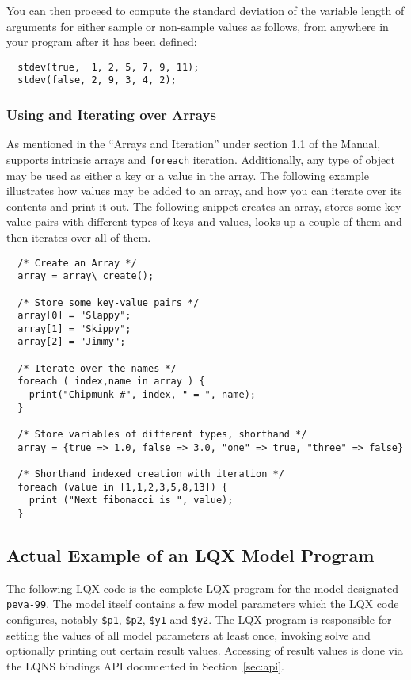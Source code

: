 You can then proceed to compute the standard deviation of the variable length of
arguments for either sample or non-sample values as follows, from anywhere in your
program after it has been defined:

\lstset{language=LQX}
\begin{lstlisting}
  stdev(true,  1, 2, 5, 7, 9, 11);
  stdev(false, 2, 9, 3, 4, 2);
\end{lstlisting}

\subsubsection{Using and Iterating over Arrays}

As mentioned in the ``Arrays and Iteration'' under section 1.1 of the Manual,
\ModLang supports intrinsic arrays and {\tt foreach} iteration. Additionally, any
type of object may be used as either a key or a value in the array. The following
example illustrates how values may be added to an array, and how you can
iterate over its contents and print it out. The following snippet creates an array,
stores some key-value pairs with different types of keys and values, looks up a
couple of them and then iterates over all of them.

\lstset{language=LQX}
\begin{lstlisting}
  /* Create an Array */
  array = array\_create();

  /* Store some key-value pairs */
  array[0] = "Slappy";
  array[1] = "Skippy";
  array[2] = "Jimmy";

  /* Iterate over the names */
  foreach ( index,name in array ) {
    print("Chipmunk #", index, " = ", name);
  }

  /* Store variables of different types, shorthand */
  array = {true => 1.0, false => 3.0, "one" => true, "three" => false}

  /* Shorthand indexed creation with iteration */
  foreach (value in [1,1,2,3,5,8,13]) {
    print ("Next fibonacci is ", value);
  }
\end{lstlisting}

\subsection{Actual Example of an LQX Model Program}

The following LQX code is the complete LQX program for the model designated {\tt peva-99}.
The model itself contains a few model parameters which the LQX code configures, notably
{\tt \$p1}, {\tt \$p2}, {\tt \$y1} and {\tt \$y2}. The LQX program is responsible for
setting the values of all model parameters at least once, invoking solve and optionally
printing out certain result values. Accessing of result values is done via the LQNS
bindings API documented in Section~\ref{sec:api}.

